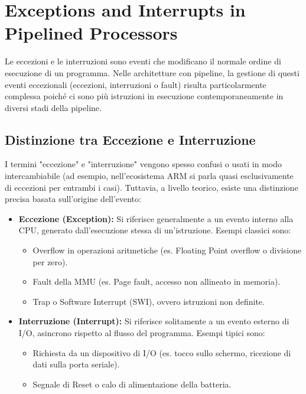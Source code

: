 \chapter{Exceptions and Interrupts in Pipelined Processors}
\label{ch:exceptions_interrupts}

Le eccezioni e le interruzioni sono eventi che modificano il normale ordine di esecuzione di un programma. Nelle architetture con pipeline, la gestione di questi eventi eccezionali (eccezioni, interruzioni o fault) risulta particolarmente complessa poiché ci sono più istruzioni in esecuzione contemporaneamente in diversi stadi della pipeline.

\section{Distinzione tra Eccezione e Interruzione}
I termini "eccezione" e "interruzione" vengono spesso confusi o usati in modo intercambiabile (ad esempio, nell'ecosistema ARM si parla quasi esclusivamente di eccezioni per entrambi i casi). Tuttavia, a livello teorico, esiste una distinzione precisa basata sull'origine dell'evento:

\begin{itemize}
    \item \textbf{Eccezione (Exception):} Si riferisce generalmente a un evento interno alla CPU, generato dall'esecuzione stessa di un'istruzione. Esempi classici sono:
    \begin{itemize}
        \item Overflow in operazioni aritmetiche (es. Floating Point overflow o divisione per zero).
        \item Fault della MMU (es. Page fault, accesso non allineato in memoria).
        \item Trap o Software Interrupt (SWI), ovvero istruzioni non definite.
    \end{itemize}
    \item \textbf{Interruzione (Interrupt):} Si riferisce solitamente a un evento esterno di I/O, asincrono rispetto al flusso del programma. Esempi tipici sono:
    \begin{itemize}
        \item Richiesta da un dispositivo di I/O (es. tocco sullo schermo, ricezione di dati sulla porta seriale).
        \item Segnale di Reset o calo di alimentazione della batteria.
    \end{itemize}
\end{itemize}

